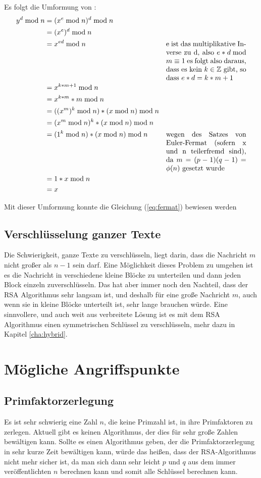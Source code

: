 \documentclass[12pt,a4paper]{scrartcl}
\begin{document}
	Es folgt die Umformung von \citeauthor{frauenhofer}:
	\begin{align*}
	 y^d \bmod n & = (x^e \bmod n)^d \bmod n & \\
	 & = (x^e)^d \bmod n &\\
 	 & =x^{ed} \bmod n &  \parbox[t]{4cm}{e ist das multiplikative Inverse zu d, also $e * d \bmod m \equiv 1$ es folgt also daraus, dass es kein $k \in \mathbb{Z}$ gibt, so dass $e*d=k*m+1$}\\
 	 & =x^{k*m+1} \bmod n & \\
 	 & =x^{k*m}*m \bmod n & \\
 	 & =((x^m)^k \bmod n) * (x \bmod n) \bmod n & \\
 	 & =(x^m \bmod n)^k * (x \bmod n) \bmod n & \\
 	 & =(1^k \bmod n) * (x \bmod n) \bmod n &  \parbox[t]{4cm}{wegen des Satzes von Euler-Fermat (sofern x und n teilerfremd sind), da $m = (p - 1)(q - 1) = \phi(n)$ gesetzt wurde} \\
 	 & = 1 * x \bmod n & \\
 	 & = x &
 	\end{align*} \cite[S.15]{frauenhofer}

	Mit dieser Umformung konnte die Gleichung (\ref{eq:fermat}) bewiesen werden 
	
	\subsection{Verschlüsselung ganzer Texte}
		\label{cha:hole_text}

	Die Schwierigkeit, ganze Texte zu verschlüsseln, liegt darin, dass die Nachricht $m$ nicht großer als $n - 1$ sein darf. Eine Möglichkeit dieses Problem zu umgehen ist es die Nachricht in verschiedene kleine Blöcke zu unterteilen und dann jeden Block einzeln zuverschlüsseln. Das hat aber immer noch den Nachteil, dass der RSA Algorithmus sehr langsam ist, und deshalb für eine große Nachricht $m$, auch wenn sie in kleine Blöcke unterteilt ist, sehr lange brauchen würde. Eine sinnvollere, und auch weit aus verbreitete Lösung ist es mit dem RSA Algorithmus einen symmetrischen Schlüssel zu verschlüsseln, mehr dazu in Kapitel \ref{cha:hybrid}.


\section{Mögliche Angriffspunkte}
	\subsection{Primfaktorzerlegung}
	\label{cha:primfaktorzerlegung}
	Es ist sehr schwierig eine Zahl $n$, die keine Primzahl ist, in ihre Primfaktoren zu zerlegen. Aktuell gibt es keinen Algorithmus, der dies für sehr große Zahlen bewältigen kann. Sollte es einen Algorithmus geben, der die Primfaktorzerlegung in sehr kurze Zeit bewältigen kann, würde das heißen, dass der RSA-Algorithmus nicht mehr sicher ist, da man sich dann sehr leicht $p$ und $q$ aus dem immer veröffentlichten $n$ berechnen kann und somit alle Schlüssel berechnen kann.
	
\end{document}
